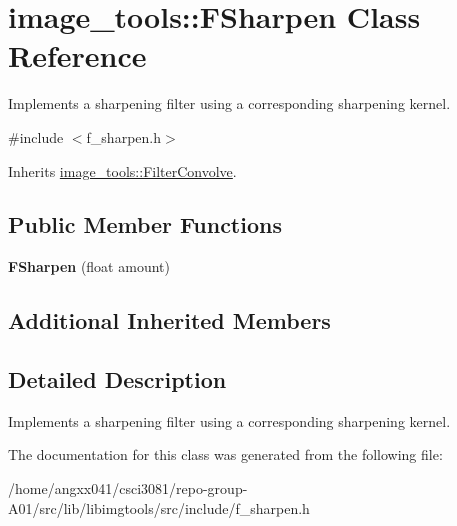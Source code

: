 \hypertarget{classimage__tools_1_1FSharpen}{}\section{image\+\_\+tools\+:\+:F\+Sharpen Class Reference}
\label{classimage__tools_1_1FSharpen}


Implements a sharpening filter using a corresponding sharpening kernel.  




{\ttfamily \#include $<$f\+\_\+sharpen.\+h$>$}



Inherits \hyperlink{classimage__tools_1_1FilterConvolve}{image\+\_\+tools\+::\+Filter\+Convolve}.

\subsection*{Public Member Functions}
\begin{DoxyCompactItemize}
\item 
{\bfseries F\+Sharpen} (float amount)\hypertarget{classimage__tools_1_1FSharpen_a0747ea46d9e9824241e4446d53a93299}{}\label{classimage__tools_1_1FSharpen_a0747ea46d9e9824241e4446d53a93299}

\end{DoxyCompactItemize}
\subsection*{Additional Inherited Members}


\subsection{Detailed Description}
Implements a sharpening filter using a corresponding sharpening kernel. 

The documentation for this class was generated from the following file\+:\begin{DoxyCompactItemize}
\item 
/home/angxx041/csci3081/repo-\/group-\/\+A01/src/lib/libimgtools/src/include/f\+\_\+sharpen.\+h\end{DoxyCompactItemize}
